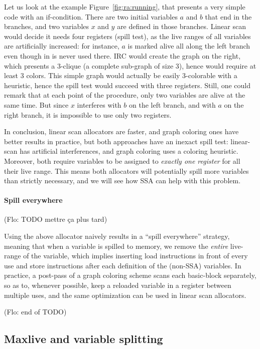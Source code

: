 {Let us look at the example Figure~\ref{fig:ra:running}, that presents a very simple code with an if-condition.
There are two initial variables $a$ and $b$ that end in the branches, and two variables $x$ and $y$ are defined in those branches.
Linear scan would decide it needs four registers (spill test), as the live ranges of all variables are artificially increased: for instance, $a$ is marked alive all along the left branch even though in is never used there.
%
IRC would create the graph on the right, which presents a 3-clique (a complete sub-graph of size 3), hence would require at least 3 colors.
This simple graph would actually be easily 3-colorable with a heuristic, hence the spill test would succeed with three registers.
%
Still, one could remark that at each point of the procedure, only two variables are alive at the same time.
But since $x$ interferes with $b$ on the left branch, and with $a$ on the right branch, it is impossible to use only two registers.

\medskip

In conclusion, linear scan allocators are faster, and graph coloring ones have better results in practice, but both approaches have an inexact spill test: linear-scan has artificial interferences, and graph coloring uses a coloring heuristic.
Moreover, both require variables to be assigned to \emph{exactly one register} for all their live range.
This means both allocators will potentially spill more variables than strictly necessary, and we will see how SSA can help with this problem.



\paragraph{Spill everywhere}
(Flo: TODO mettre ça plus tard)

Using the above allocator naively results in a ``spill everywhere'' strategy, meaning that when a variable is spilled to memory, we remove the \emph{entire} live-range of the variable, which implies inserting load instructions in front of every use and store instructions after each definition of the (non-SSA) variables.
In practice, a post-pass of a graph coloring scheme scans each basic-block separately, so as to, whenever possible, keep a reloaded variable in a register between multiple uses, and the same optimization can be used in linear scan allocators.

(Flo: end of TODO)


\subsection{Maxlive and variable splitting}




}
